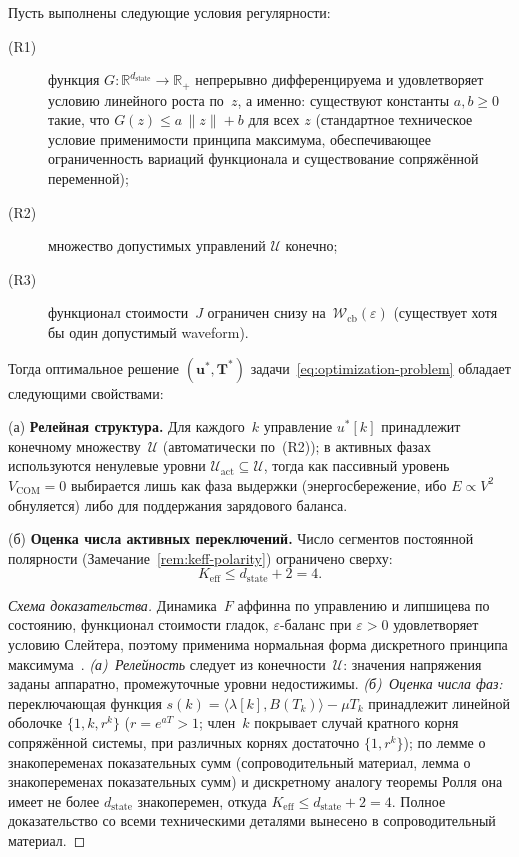 \begin{theorem}
\label{thm:main}
Пусть выполнены следующие условия регулярности:
\begin{description}
    \item[(R1)] функция $G : \mathbb{R}^{d_{\mathrm{state}}} \to \mathbb{R}_+$
        непрерывно дифференцируема и удовлетворяет условию линейного роста
        по~$z$, а именно: существуют константы $a, b \ge 0$ такие, что
        $G(z) \le a\, \|z\| + b$ для всех $z$ (стандартное техническое
        условие применимости принципа максимума, обеспечивающее ограниченность
        вариаций функционала и существование сопряжённой переменной);
    \item[(R2)] множество допустимых управлений $\mathcal{U}$ конечно;
    \item[(R3)] функционал стоимости~$J$ ограничен снизу
        на~$\mathcal{W}_{\mathrm{cb}}(\varepsilon)$ (существует хотя бы
        один допустимый waveform).
\end{description}
Тогда оптимальное решение $(\mathbf{u}^*, \mathbf{T}^*)$
задачи~\eqref{eq:optimization-problem} обладает следующими свойствами:

\textnormal{(а) \textbf{Релейная структура.}} Для каждого~$k$ управление
$u^*[k]$ принадлежит конечному множеству~$\mathcal{U}$ (автоматически по~(R2));
в активных фазах используются ненулевые уровни
$\mathcal{U}_{\mathrm{act}} \subseteq \mathcal{U}$, тогда как пассивный
уровень $V_{\mathrm{COM}} = 0$ выбирается лишь как фаза выдержки
(энергосбережение, ибо $E \propto V^2$ обнуляется) либо для поддержания
зарядового баланса.

\textnormal{(б) \textbf{Оценка числа активных переключений.}}
Число сегментов постоянной полярности (Замечание~\ref{rem:keff-polarity})
ограничено сверху:
$$K_{\mathrm{eff}} \le d_{\mathrm{state}} + 2 = 4.$$
\end{theorem}

\begin{proof}[Схема доказательства]
Динамика~$F$ аффинна по управлению и липшицева по состоянию, функционал стоимости
гладок, $\varepsilon$-баланс при $\varepsilon>0$ удовлетворяет условию Слейтера, поэтому
применима нормальная форма дискретного принципа
максимума~\cite{paruchuri2019_discrete_pmp}. \emph{(а)~Релейность} следует из
конечности~$\mathcal{U}$: значения напряжения заданы аппаратно, промежуточные
уровни недостижимы. \emph{(б)~Оценка числа фаз:} переключающая функция
$s(k)=\langle\lambda[k],B(T_k)\rangle-\mu T_k$ принадлежит линейной оболочке
$\{1,k,r^{k}\}$ ($r=e^{aT}>1$; член~$k$ покрывает случай кратного корня
сопряжённой системы, при различных корнях достаточно $\{1,r^{k}\}$); по лемме о знакопеременах показательных сумм
(сопроводительный материал, лемма о знакопеременах показательных сумм) и дискретному
аналогу теоремы Ролля она имеет не более $d_{\mathrm{state}}$ знакоперемен, откуда
$K_{\mathrm{eff}}\le d_{\mathrm{state}}+2=4$. Полное доказательство со всеми
техническими деталями вынесено в сопроводительный материал.\qedhere
\end{proof}


